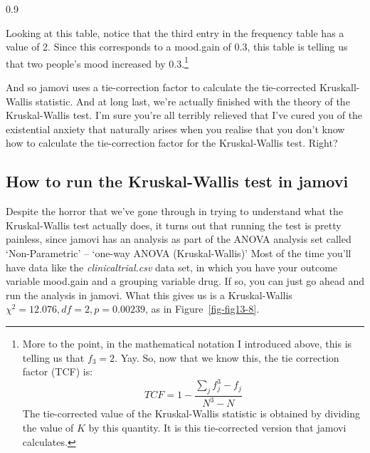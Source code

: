 \documentclass[
  a4paper,
]{book}
\begin{document}
\begin{table}[ht]
\begin{centerbox}
\begin{threeparttable}
\begin{tabularx}{0.9\textwidth}
\end{tabularx} 

\end{threeparttable}\par\end{centerbox}

\end{table}
 

Looking at this table, notice that the third entry in the frequency
table has a value of 2. Since this corresponds to a mood.gain of 0.3,
this table is telling us that two people's mood increased by
0.3.\footnote{More to the point, in the mathematical notation I
  introduced above, this is telling us that \(f_3 = 2\). Yay. So, now
  that we know this, the tie correction factor (TCF) is:
  \[TCF=1-\frac{\sum_j f_j^3 - f_j}{N^3 - N}\] The tie-corrected value
  of the Kruskal-Wallis statistic is obtained by dividing the value of
  \(K\) by this quantity. It is this tie-corrected version that jamovi
  calculates.}

And so jamovi uses a tie-correction factor to calculate the
tie-corrected Kruskall-Wallis statistic. And at long last, we're
actually finished with the theory of the Kruskal-Wallis test. I'm sure
you're all terribly relieved that I've cured you of the existential
anxiety that naturally arises when you realise that you don't know how
to calculate the tie-correction factor for the Kruskal-Wallis test.
Right?

\hypertarget{how-to-run-the-kruskal-wallis-test-in-jamovi}{%
\subsection{How to run the Kruskal-Wallis test in
jamovi}\label{how-to-run-the-kruskal-wallis-test-in-jamovi}}

Despite the horror that we've gone through in trying to understand what
the Kruskal-Wallis test actually does, it turns out that running the
test is pretty painless, since jamovi has an analysis as part of the
ANOVA analysis set called `Non-Parametric' -- `one-way ANOVA
(Kruskal-Wallis)' Most of the time you'll have data like the
\emph{clinicaltrial.csv} data set, in which you have your outcome
variable mood.gain and a grouping variable drug. If so, you can just go
ahead and run the analysis in jamovi. What this gives us is a
Kruskal-Wallis \(\chi^2 =12.076, df = 2, p = 0.00239\), as in
Figure~\ref{fig-fig13-8}.
\end{document}
